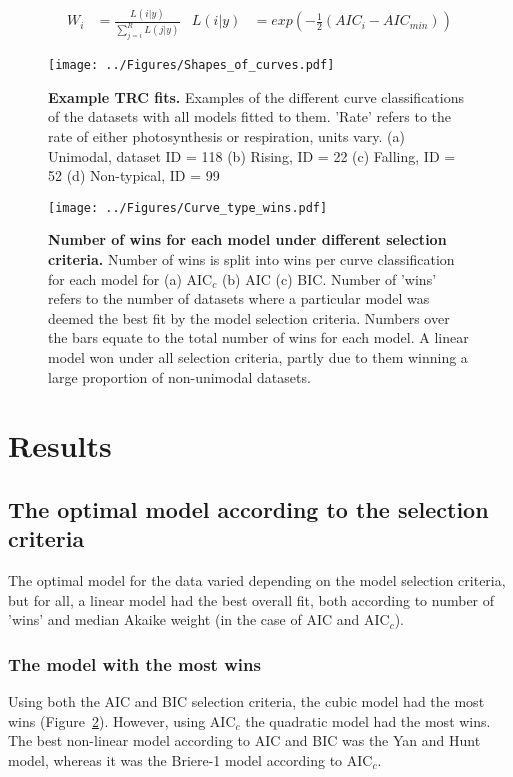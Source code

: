 \documentclass[11pt, a4paper]{article}
\begin{document}
	\begin{align} \label{eg:weights}
	W_i &= \frac{L(i | y)}{\sum_{j = i}^{R}L(j | y) }
	& L(i | y) &= exp(-\frac{1}{2} (AIC_i - AIC_{min})) 
	\end{align}
	
	
\begin{figure} [H]
	\texttt{[image: ../Figures/Shapes\_of\_curves.pdf]}
	\caption{\label{fig:curves} \textbf{Example TRC fits.} Examples of the different curve classifications of the datasets with all models fitted to them. 'Rate' refers to the rate of either photosynthesis or respiration, units vary. (a) Unimodal, dataset ID = 118 (b) Rising, ID = 22 (c) Falling, ID = 52 (d) Non-typical, ID = 99}
\end{figure}	

\begin{figure} [H]
	\centering
	\texttt{[image: ../Figures/Curve\_type\_wins.pdf]}
	\caption{\label{fig:wins_plot} \textbf{Number of wins for each model under different selection criteria.} Number of wins is split into wins per curve classification for each model for (a) AIC$_c$ (b) AIC (c) BIC. Number of 'wins' refers to the number of datasets where a particular model was deemed the best fit by the model selection criteria. Numbers over the bars equate to the total number of wins for each model. A linear model won under all selection criteria, partly due to them winning a large proportion of non-unimodal datasets.}	
\end{figure}

\section{Results}

\subsection{The optimal model according to the selection criteria}
The optimal model for the data varied depending on the model selection criteria, but for all, a linear model had the best overall fit, both according to number of 'wins' and median Akaike weight (in the case of AIC and AIC$_c$).

\subsubsection*{The model with the most wins}
Using both the AIC and BIC selection criteria, the cubic model had the most wins (Figure~\ref{fig:wins_plot}). However, using AIC$_c$ the quadratic model had the most wins. The best non-linear model according to AIC and BIC was the Yan and Hunt model, whereas it was the Briere-1 model according to AIC$_c$.
\end{document}
